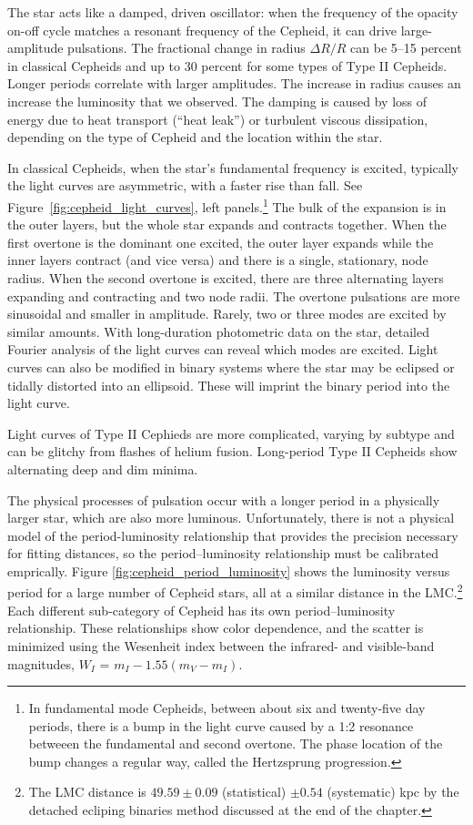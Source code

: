 The star acts like a damped, driven oscillator: when the frequency of the opacity on-off cycle matches a resonant frequency of the Cepheid, it can drive large-amplitude pulsations.  The fractional change in radius $\Delta R/R$ can be 5--15 percent in classical Cepheids and up to 30 percent for some types of Type II Cepheids.  Longer periods correlate with larger amplitudes.  The increase in radius causes an increase the luminosity that we observed.  The damping is caused by loss of energy due to heat transport (``heat leak'') or turbulent viscous dissipation, depending on the type of Cepheid and the location within the star.

In classical Cepheids, when the star's fundamental frequency is excited, typically the light curves are asymmetric, with a faster rise than fall.  See Figure~\ref{fig:cepheid_light_curves}, left panels.\footnote{In fundamental mode Cepheids, between about six and twenty-five day periods, there is a bump in the light curve caused by a 1:2 resonance betweeen the fundamental and second overtone.  The phase location of the bump changes a regular way, called the Hertzsprung progression.}  The bulk of the expansion is in the outer layers, but the whole star expands and contracts together.  When the first overtone is the dominant one excited, the outer layer expands while the inner layers contract (and vice versa) and there is a single, stationary, node radius.  When the second overtone is excited, there are three alternating layers expanding and contracting and two node radii.  The overtone pulsations are more sinusoidal and smaller in amplitude.  Rarely, two or three modes are excited by similar amounts.  With long-duration photometric data on the star, detailed Fourier analysis of the light curves can reveal which modes are excited.  Light curves can also be modified in binary systems where the star may be eclipsed or tidally distorted into an ellipsoid.  These will imprint the binary period into the light curve.

Light curves of Type II Cephieds are more complicated, varying by subtype and can be glitchy from flashes of helium fusion.  Long-period Type II Cepheids show alternating deep and dim minima.

The physical processes of pulsation occur with a longer period in a physically larger star, which are also more luminous.  Unfortunately, there is not a physical model of the period-luminosity relationship that provides the precision necessary for fitting distances, so the period--luminosity relationship must be calibrated emprically.  Figure \ref{fig:cepheid_period_luminosity} shows the luminosity versus period for a large number of Cepheid stars, all at a similar distance in the LMC.\footnote{The LMC distance is $49.59 \pm 0.09$ (statistical) $\pm 0.54$ (systematic) kpc by the detached ecliping binaries method \citep[][]{2019Natur.567..200P} discussed at the end of the chapter.}
Each different sub-category of Cepheid has its own period--luminosity relationship.  These relationships show color dependence, and the scatter is minimized using the Wesenheit index between the infrared- and visible-band magnitudes, $W_I$ = $m_I - 1.55(m_V - m_I)$.

